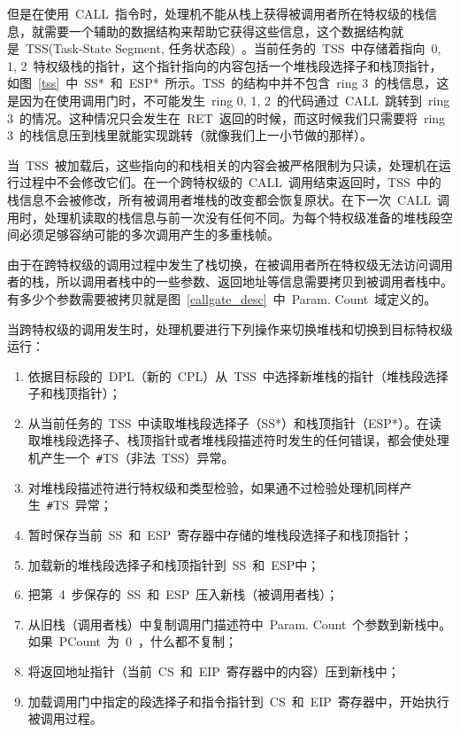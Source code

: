 
但是在使用~CALL~指令时，处理机不能从栈上获得被调用者所在特权级的栈信息，就需要一个辅助的数据结构来帮助它获得这些信息，这个数据结构就是~TSS(Task-State Segment, 任务状态段)~。当前任务的~TSS~中存储着指向~0, 1, 2~特权级栈的指针，这个指针指向的内容包括一个堆栈段选择子和栈顶指针，如图~\ref{tss}~中~SS*~和~ESP*~所示。TSS~的结构中并不包含~ring 3~的栈信息，这是因为在使用调用门时，不可能发生~ring 0, 1, 2~的代码通过~CALL~跳转到~ring 3~的情况。这种情况只会发生在~RET~返回的时候，而这时候我们只需要将~ring 3~的栈信息压到栈里就能实现跳转（就像我们上一小节做的那样）。

当~TSS~被加载后，这些指向的和栈相关的内容会被严格限制为只读，处理机在运行过程中不会修改它们。在一个跨特权级的~CALL~调用结束返回时，TSS~中的栈信息不会被修改，所有被调用者堆栈的改变都会恢复原状。在下一次~CALL~调用时，处理机读取的栈信息与前一次没有任何不同。为每个特权级准备的堆栈段空间必须足够容纳可能的多次调用产生的多重栈帧。

由于在跨特权级的调用过程中发生了栈切换，在被调用者所在特权级无法访问调用者的栈，所以调用者栈中的一些参数、返回地址等信息需要拷贝到被调用者栈中。有多少个参数需要被拷贝就是图~\ref{callgate_desc}~中~Param. Count~域定义的。

当跨特权级的调用发生时，处理机要进行下列操作来切换堆栈和切换到目标特权级运行：

\begin{enumerate}
\item 依据目标段的~DPL（新的~CPL）从~TSS~中选择新堆栈的指针（堆栈段选择子和栈顶指针）；
\item 从当前任务的~TSS~中读取堆栈段选择子（SS*）和栈顶指针（ESP*）。在读取堆栈段选择子、栈顶指针或者堆栈段描述符时发生的任何错误，都会使处理机产生一个~\texttt{\#}TS（非法~TSS）异常。
\item 对堆栈段描述符进行特权级和类型检验，如果通不过检验处理机同样产生~\texttt{\#}TS~异常；
\item 暂时保存当前~SS~和~ESP~寄存器中存储的堆栈段选择子和栈顶指针；
\item 加载新的堆栈段选择子和栈顶指针到~SS~和~ESP中；
\item 把第~4~步保存的~SS~和~ESP~压入新栈（被调用者栈）；
\item 从旧栈（调用者栈）中复制调用门描述符中~Param. Count~个参数到新栈中。如果~PCount~为~0~，什么都不复制；
\item 将返回地址指针（当前~CS~和~EIP~寄存器中的内容）压到新栈中；
\item 加载调用门中指定的段选择子和指令指针到~CS~和~EIP~寄存器中，开始执行被调用过程。
\end{enumerate}

